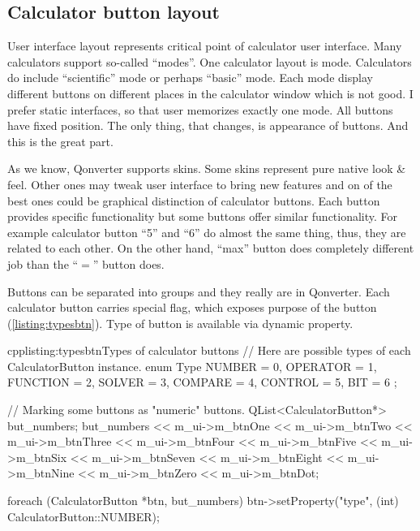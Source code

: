 \subsection{Calculator button layout}
User interface layout represents critical point of calculator user interface. Many calculators support so-called \enquote{modes}. One calculator layout is mode. Calculators do include \enquote{scientific} mode or perhaps \enquote{basic} mode. Each mode display different buttons on different places in the calculator window which is not good. I prefer static interfaces, so that user memorizes exactly one mode. All buttons have fixed position. The only thing, that changes, is appearance of buttons. And this is the great part.

As we know, Qonverter supports skins. Some skins represent pure native look \& feel. Other ones may tweak user interface to bring new features and on of the best ones could be graphical distinction of calculator buttons. Each button provides specific functionality but some buttons offer similar functionality. For example calculator button \enquote{5} and \enquote{6} do almost the same thing, thus, they are related to each other. On the other hand, \enquote{max} button does completely different job than the \enquote{$=$} button does.

Buttons can be separated into groups and they really are in Qonverter. Each calculator button carries special flag, which exposes purpose of the button (\autoref{listing:typesbtn}). Type of button is available via dynamic property.
\begin{fdoccode}{cpp}{listing:typesbtn}{Types of calculator buttons}
// Here are possible types of each CalculatorButton instance.
enum Type {
    NUMBER	= 0,
    OPERATOR	= 1,
    FUNCTION	= 2,
    SOLVER	= 3,
    COMPARE	= 4,
    CONTROL	= 5,
    BIT		= 6
};

// Marking some buttons as "numeric" buttons.
QList<CalculatorButton*> but_numbers;
but_numbers <<	m_ui->m_btnOne << m_ui->m_btnTwo <<
				m_ui->m_btnThree << m_ui->m_btnFour <<
				m_ui->m_btnFive << m_ui->m_btnSix <<
				m_ui->m_btnSeven << m_ui->m_btnEight <<
				m_ui->m_btnNine << m_ui->m_btnZero <<
				m_ui->m_btnDot;

foreach (CalculatorButton *btn, but_numbers) {
	btn->setProperty("type", (int) CalculatorButton::NUMBER);
}
\end{fdoccode}

